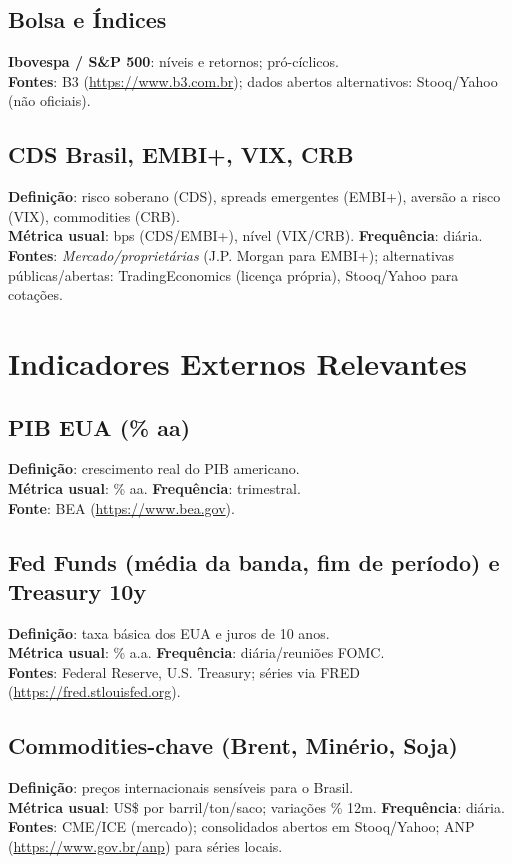 \documentclass[11pt,a4paper]{article}
\begin{document}
\subsection*{Bolsa e Índices}
\textbf{Ibovespa / S\&P 500}: níveis e retornos; pró-cíclicos. \\
\textbf{Fontes}: B3 (\url{https://www.b3.com.br}); dados abertos alternativos: Stooq/Yahoo (não oficiais).

\subsection*{CDS Brasil, EMBI+, VIX, CRB}
\textbf{Definição}: risco soberano (CDS), spreads emergentes (EMBI+), aversão a risco (VIX), commodities (CRB).\\
\textbf{Métrica usual}: bps (CDS/EMBI+), nível (VIX/CRB). \textbf{Frequência}: diária.\\
\textbf{Fontes}: \emph{Mercado/proprietárias} (J.P. Morgan para EMBI+); alternativas públicas/abertas: TradingEconomics (licença própria), Stooq/Yahoo para cotações.

\section{Indicadores Externos Relevantes}
\subsection*{PIB EUA (\% aa)}
\textbf{Definição}: crescimento real do PIB americano.\\
\textbf{Métrica usual}: \% aa. \textbf{Frequência}: trimestral.\\
\textbf{Fonte}: BEA (\url{https://www.bea.gov}).

\subsection*{Fed Funds (média da banda, fim de período) e Treasury 10y}
\textbf{Definição}: taxa básica dos EUA e juros de 10 anos.\\
\textbf{Métrica usual}: \% a.a. \textbf{Frequência}: diária/reuniões FOMC.\\
\textbf{Fontes}: Federal Reserve, U.S. Treasury; séries via FRED (\url{https://fred.stlouisfed.org}).

\subsection*{Commodities-chave (Brent, Minério, Soja)}
\textbf{Definição}: preços internacionais sensíveis para o Brasil.\\
\textbf{Métrica usual}: US\$ por barril/ton/saco; variações \% 12m. \textbf{Frequência}: diária.\\
\textbf{Fontes}: CME/ICE (mercado); consolidados abertos em Stooq/Yahoo; ANP (\url{https://www.gov.br/anp}) para séries locais.
\end{document}
